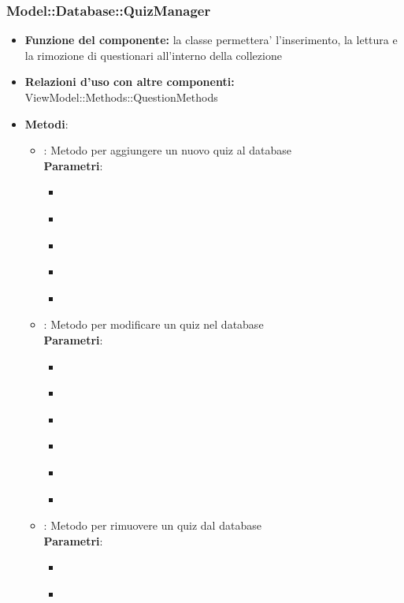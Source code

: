\subsubsection{Model::Database::QuizManager}
\begin{itemize}
\item\textbf{Funzione del componente:} la classe permettera' l'inserimento, la lettura e la rimozione di questionari all'interno della collezione
\item\textbf{Relazioni d'uso con altre componenti:} ViewModel::Methods::QuestionMethods\\
\item\textbf{Metodi}:
\begin{itemize}
	\item{} : Metodo per aggiungere un nuovo quiz al database\\
	\textbf{Parametri}:
	\begin{itemize}
		\item{}\\
		\item{}\\
		\item{}\\
		\item{}\\
		\item{}\\
	\end{itemize}
	\item{} :  Metodo per modificare un quiz nel database\\
	\textbf{Parametri}:
	\begin{itemize}
		\item{}\\
		\item{}\\
		\item{}\\
		\item{}\\
		\item{}\\
		\item{}\\
	\end{itemize}
	\item{} : Metodo per rimuovere un quiz dal database\\
	\textbf{Parametri}:
	\begin{itemize}
		\item{}\\
		\item{}\\
	\end{itemize}
\end{itemize}
\end{itemize}

